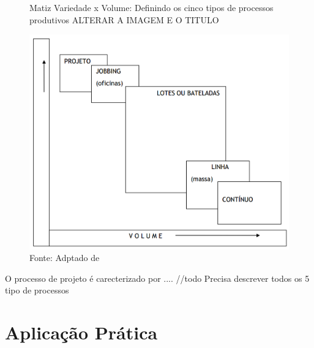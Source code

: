 \begin{figure}[H]
  \caption{Matiz Variedade x Volume: Definindo os cinco tipos de processos produtivos ALTERAR A IMAGEM E O TITULO}
  \includegraphics[scale=0.5]{images/tiposdeprocesso.png}
  \caption*{Fonte: Adptado de \cite{slack2009administracao}}
  \label{fig:tipos_de_processo_de_producao}
\end{figure}

O processo de projeto é carecterizado por .... //todo Precisa descrever todos os 5 tipo de processos 

\section{Aplicação Prática}
\label{sec:tipos_de_processo_de_producao_aplicacao}
